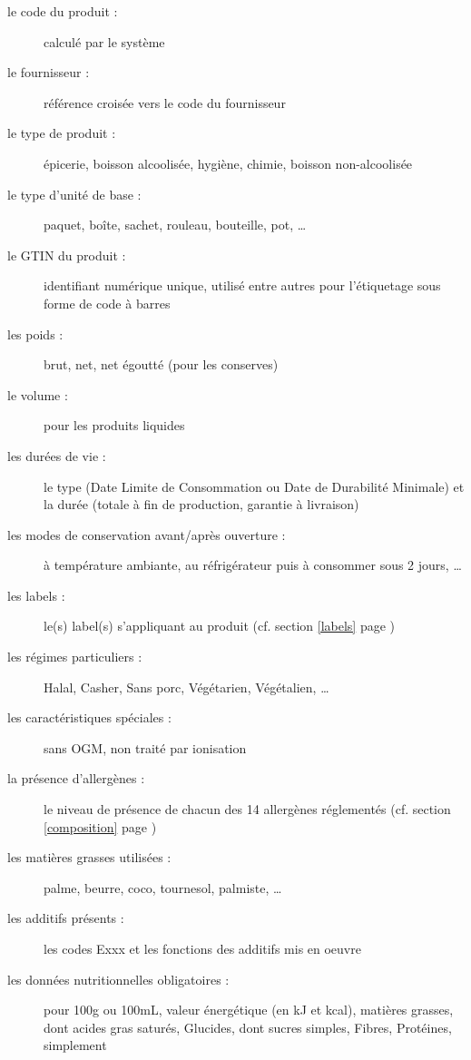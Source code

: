         \begin{description}
            \item[le code du produit :] calculé par le système
            \item[le fournisseur :] référence croisée vers le code du fournisseur
            \item[le type de produit :] épicerie, boisson alcoolisée, hygiène, chimie, boisson non-alcoolisée
            \item[le type d'unité de base :] paquet, boîte, sachet, rouleau, bouteille, pot, \dots
            \item[le GTIN du produit :] identifiant numérique unique, utilisé entre autres pour l'étiquetage sous forme de code à barres~\cite{GS1_GTIN}
            \item[les poids :] brut, net, net égoutté (pour les conserves)
            \item[le volume :] pour les produits liquides
            \item[les durées de vie :] le type (Date Limite de Consommation ou Date de Durabilité Minimale) et la durée (totale à fin de production, garantie à livraison)
            \item[les modes de conservation avant/après ouverture :] à température ambiante, au réfrigérateur puis à consommer sous 2 jours, \dots
            \item[les labels :] le(s) label(s) s'appliquant au produit (cf. section \ref{labels} page \pageref{labels})
            \item[les régimes particuliers :] Halal, Casher, Sans porc, Végétarien, Végétalien, \dots
            \item[les caractéristiques spéciales :] sans OGM, non traité par ionisation
            \item[la présence d'allergènes :] le niveau de présence de chacun des 14 allergènes réglementés (cf. section \ref{composition} page \pageref{composition})
            \item[les matières grasses utilisées :] palme, beurre, coco, tournesol, palmiste, \dots
            \item[les additifs présents :] les codes Exxx et les fonctions des additifs mis en oeuvre~\cite{additifs_regl_eu}\cite{additifs_wiki}
            \item[les données nutritionnelles obligatoires :] pour 100g ou 100mL, valeur énergétique (en kJ et kcal), matières grasses, dont acides gras saturés, Glucides, dont sucres simples, Fibres, Protéines, simplement

\end{description}
